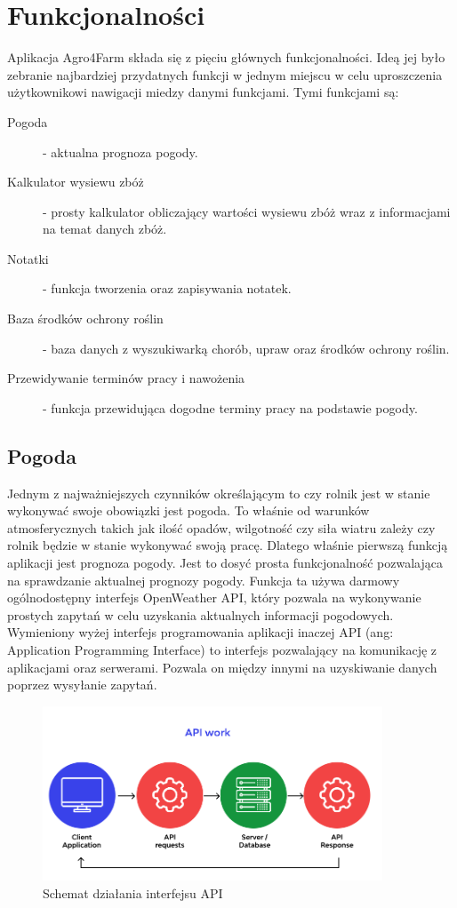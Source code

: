 \documentclass[a4paper,12pt,oneside]{book}
\begin{document}
	\section{Funkcjonalności}
	Aplikacja Agro4Farm składa się z pięciu głównych funkcjonalności. Ideą jej było zebranie najbardziej przydatnych funkcji w jednym miejscu w celu uproszczenia użytkownikowi nawigacji miedzy danymi funkcjami. Tymi funkcjami są:
	\begin{description}
		\item[Pogoda] - aktualna prognoza pogody.
		\item[Kalkulator wysiewu zbóż] - prosty kalkulator obliczający wartości wysiewu zbóż wraz z informacjami na temat danych zbóż.
		\item[Notatki] - funkcja tworzenia oraz zapisywania notatek.
		\item[Baza środków ochrony roślin] - baza danych z wyszukiwarką chorób, upraw oraz środków ochrony roślin.
		\item[Przewidywanie terminów pracy i nawożenia] - funkcja przewidująca dogodne terminy pracy na podstawie pogody.
	\end{description}
	
	\newpage
	
	\subsection{Pogoda}
		Jednym z najważniejszych czynników określającym to czy rolnik jest w stanie wykonywać swoje obowiązki jest pogoda. To właśnie od warunków atmosferycznych takich jak ilość opadów, wilgotność czy siła wiatru zależy czy rolnik będzie w stanie wykonywać swoją pracę. Dlatego właśnie pierwszą funkcją aplikacji jest prognoza pogody. Jest to dosyć prosta funkcjonalność pozwalająca na sprawdzanie aktualnej prognozy pogody. Funkcja ta używa darmowy ogólnodostępny interfejs OpenWeather API, który pozwala na wykonywanie prostych zapytań w celu uzyskania aktualnych informacji pogodowych. Wymieniony wyżej interfejs programowania aplikacji inaczej API (ang: Application Programming Interface) to interfejs pozwalający na komunikację z aplikacjami oraz serwerami. Pozwala on między innymi na uzyskiwanie danych poprzez wysyłanie zapytań. 
	
	\begin{figure}[H]
		\centering
		\includegraphics[width=0.9\textwidth]{grafika/api.png}
		\caption{Schemat działania interfejsu API}
	\end{figure}
\end{document}
